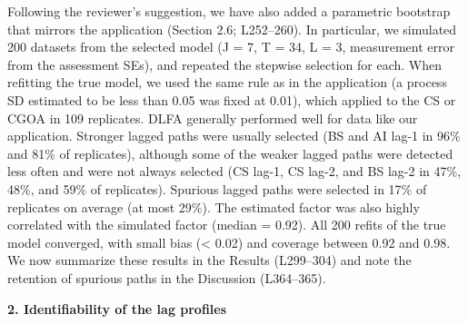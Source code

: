 \documentclass[11pt]{article}
\begin{document}
Following the reviewer's suggestion, we have also added a parametric
bootstrap that mirrors the application (Section 2.6; L252--260). In
particular, we simulated 200 datasets from the selected model (J = 7, T
= 34, L = 3, measurement error from the assessment SEs), and repeated
the stepwise selection for each. When refitting the true model, we used
the same rule as in the application (a process SD estimated to be less
than 0.05 was fixed at 0.01), which applied to the CS or CGOA in 109
replicates. DLFA generally performed well for data like our application.
Stronger lagged paths were usually selected (BS and AI lag-1 in 96\% and
81\% of replicates), although some of the weaker lagged paths were
detected less often and were not always selected (CS lag-1, CS lag-2,
and BS lag-2 in 47\%, 48\%, and 59\% of replicates). Spurious lagged
paths were selected in 17\% of replicates on average (at most 29\%). The
estimated factor was also highly correlated with the simulated factor
(median = 0.92). All 200 refits of the true model converged, with small
bias (\textless{} 0.02) and coverage between 0.92 and 0.98. We now
summarize these results in the Results (L299--304) and note the
retention of spurious paths in the Discussion (L364--365).

\textbf{2. Identifiability of the lag profiles}
\end{document}
